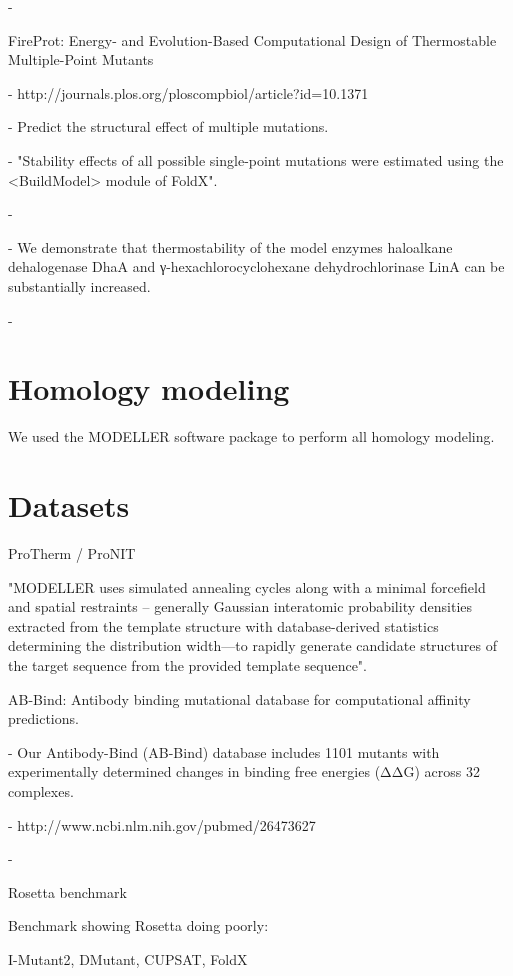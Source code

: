  - \cite{fariselli_inps_2015}
 

FireProt: Energy- and Evolution-Based Computational Design of Thermostable Multiple-Point Mutants

  - http://journals.plos.org/ploscompbiol/article?id=10.1371%
  
  - Predict the structural effect of multiple mutations.
  
  - "Stability effects of all possible single-point mutations were estimated using the <BuildModel> module of FoldX".
  
  - 
  
  - We demonstrate that thermostability of the model enzymes haloalkane dehalogenase DhaA and γ-hexachlorocyclohexane dehydrochlorinase LinA can be substantially increased.
  
  - \cite{bednar_fireprot_2015}




\section{Homology modeling}

We used the MODELLER software package to perform all homology modeling.







\section{Datasets}

ProTherm / ProNIT \cite{Zeng2011} \cite{kumar_protherm_2006}

"MODELLER uses simulated annealing cycles along with a minimal forcefield and spatial restraints -- generally Gaussian interatomic probability densities extracted from the template structure with database-derived statistics determining the distribution width—to rapidly generate candidate structures of the target sequence from the provided template sequence".


AB-Bind: Antibody binding mutational database for computational affinity predictions.

  - Our Antibody-Bind (AB-Bind) database includes 1101 mutants with experimentally determined changes in binding free energies (ΔΔG) across 32 complexes.
  
  - http://www.ncbi.nlm.nih.gov/pubmed/26473627
  
  - \cite{sirin_ab-bind_2016}


Rosetta benchmark \cite{o_conchuir_web_2015}

Benchmark showing Rosetta doing poorly: \cite{potapov_assessing_2009}

I-Mutant2, DMutant, CUPSAT, FoldX \cite{khan_performance_2010}

